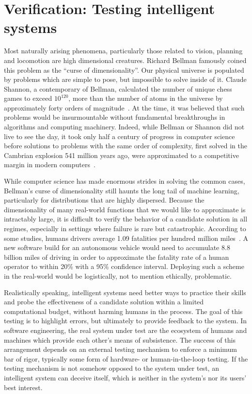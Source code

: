\documentclass[12pt,initial,twoside,maitrise]{dms}
\numberwithin{equation}{section}
\numberwithin{table}{chapter}
\numberwithin{figure}{chapter}
\begin{document}
\section{Verification: Testing intelligent systems}

Most naturally arising phenomena, particularly those related to vision, planning and locomotion are high dimensional creatures. Richard Bellman famously coined this problem as the ``curse of dimensionality''. Our physical universe is populated by problems which are simple to pose, but impossible to solve inside of it. Claude Shannon, a contemporary of Bellman, calculated the number of unique chess games to exceed $10^{120}$, more than the number of atoms in the universe by approximately forty orders of magnitude~\citep{shannon1950chess}. At the time, it was believed that such problems would be insurmountable without fundamental breakthroughs in algorithms and computing machinery. Indeed, while Bellman or Shannon did not live to see the day, it took only half a century of progress in computer science before solutions to problems with the same order of complexity, first solved in the Cambrian explosion 541 million years ago, were approximated to a competitive margin in modern computers~\citep{pratt2015cambrian}.

While computer science has made enormous strides in solving the common cases, Bellman's curse of dimensionality still haunts the long tail of machine learning, particularly for distributions that are highly dispersed. Because the dimensionality of many real-world functions that we would like to approximate is intractably large, it is difficult to verify the behavior of a candidate solution in all regimes, especially in settings where failure is rare but catastrophic. According to some studies, humans drivers average 1.09 fatalities per hundred million miles~\citep{kalra2016driving}. A new software build for an autonomous vehicle would need to accumulate 8.8 billion miles of driving in order to approximate the fatality rate of a human operator to within 20\% with a 95\% confidence interval. Deploying such a scheme in the real-world would be logistically, not to mention ethically, problematic.

Realistically speaking, intelligent systems need better ways to practice their skills and probe the effectiveness of a candidate solution within a limited computational budget, without harming humans in the process. The goal of this testing is to highlight errors, but ultimately to provide feedback to the system. In software engineering, the real system under test are the ecosystem of humans and machines which provide each other's means of subsistence. The success of this arrangement depends on an external testing mechanism to enforce a minimum bar of rigor, typically some form of hardware- or human-in-the-loop testing. If the testing mechanism is not somehow opposed to the system under test, an intelligent system can deceive itself, which is neither in the system's nor its users' best interest.
\end{document}
